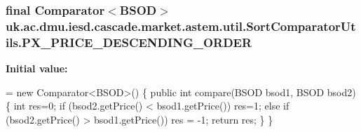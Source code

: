 \hypertarget{classuk_1_1ac_1_1dmu_1_1iesd_1_1cascade_1_1market_1_1astem_1_1util_1_1_sort_comparator_utils_afb1987a1183f8b8faf7d7e765cfcd3aa}{
\subsubsection[{P\-X\-\_\-\-P\-R\-I\-C\-E\-\_\-\-D\-E\-S\-C\-E\-N\-D\-I\-N\-G\-\_\-\-O\-R\-D\-E\-R}]{\setlength{\rightskip}{0pt plus 5cm}final Comparator$<${\bf B\-S\-O\-D}$>$ uk.\-ac.\-dmu.\-iesd.\-cascade.\-market.\-astem.\-util.\-Sort\-Comparator\-Utils.\-P\-X\-\_\-\-P\-R\-I\-C\-E\-\_\-\-D\-E\-S\-C\-E\-N\-D\-I\-N\-G\-\_\-\-O\-R\-D\-E\-R\hspace{0.3cm}{\ttfamily [static]}}}\label{classuk_1_1ac_1_1dmu_1_1iesd_1_1cascade_1_1market_1_1astem_1_1util_1_1_sort_comparator_utils_afb1987a1183f8b8faf7d7e765cfcd3aa}
{\bfseries Initial value\-:}
\begin{DoxyCode}
=    \textcolor{keyword}{new} Comparator<BSOD>() \{
        \textcolor{keyword}{public} \textcolor{keywordtype}{int} compare(BSOD bsod1, BSOD bsod2) \{
            \textcolor{keywordtype}{int} res=0;
            \textcolor{keywordflow}{if} (bsod2.getPrice() < bsod1.getPrice())
                res=1;
            \textcolor{keywordflow}{else} \textcolor{keywordflow}{if} (bsod2.getPrice() > bsod1.getPrice())
                res = -1;
            \textcolor{keywordflow}{return} res;
        \}
    \}
\end{DoxyCode}

